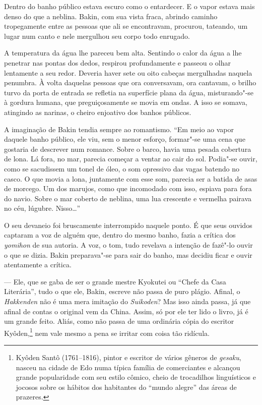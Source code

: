 \sectionitem
Dentro do banho público estava escuro como o entardecer. E o vapor
estava mais denso do que a neblina. Bakin, com sua vista fraca, abrindo
caminho tropegamente entre as pessoas que ali se encontravam, procurou,
tateando, um lugar num canto e nele mergulhou seu corpo todo enrugado.

A temperatura da água lhe pareceu bem alta. Sentindo o calor da água a
lhe penetrar nas pontas dos dedos, respirou profundamente e passeou o
olhar lentamente a seu redor. Deveria haver sete ou oito cabeças
mergulhadas naquela penumbra. À volta daquelas pessoas que ora
conversavam, ora cantavam, o brilho turvo da porta de entrada se
refletia na superfície plana da água, misturando"-se à gordura humana,
que preguiçosamente se movia em ondas. A isso se somava, atingindo as
narinas, o cheiro enjoativo dos banhos públicos.

A imaginação de Bakin tendia sempre ao romantismo. ``Em meio ao vapor
daquele banho público, ele viu, sem o menor esforço, formar"-se uma cena
que gostaria de descrever num romance. Sobre o barco, havia uma pesada
cobertura de lona. Lá fora, no mar, parecia começar a ventar ao cair do
sol. Podia"-se ouvir, como se sacudissem um tonel de óleo, o som
opressivo das vagas batendo no casco. O que movia a lona, juntamente
com esse som, parecia ser a batida de asas de morcego. Um dos marujos,
como que incomodado com isso, espiava para fora do navio. Sobre o mar
coberto de neblina, uma lua crescente e vermelha pairava no céu,
lúgubre. Nisso\ldots{}''

O seu devaneio foi bruscamente interrompido naquele ponto. É que seus
ouvidos captaram a voz de alguém que, dentro do mesmo banho, fazia a
crítica dos \textit{yomihon} de sua autoria. A voz, o tom, tudo
revelava a intenção de fazê"-lo ouvir o que se dizia. Bakin preparava"-se
para sair do banho, mas decidiu ficar e ouvir atentamente a crítica.

--- Ele, que se gaba de ser o grande mestre Kyokutei ou ``Chefe da Casa
Literária'', tudo o que ele, Bakin, escreve não passa de puro plágio.
Afinal, o \textit{Hakkenden} não é uma mera imitação do
\textit{Suikoden}? Mas isso ainda passa, já que afinal de contas o
original vem da China. Assim, só por ele ter lido o livro, já é um
grande feito. Aliás, como não passa de uma ordinária cópia do escritor
Kyôden,\footnote{ Kyôden Santô (1761--1816), pintor e escritor de vários 
gêneros de \textit{gesaku}, nasceu na cidade de Edo numa típica família de comerciantes 
e alcançou grande popularidade com seu estilo cômico, cheio de trocadilhos 
linguísticos e jocosos sobre os hábitos dos habitantes do ``mundo alegre'' 
das áreas de prazeres.} nem vale mesmo a pena se irritar com coisa tão ridícula.

